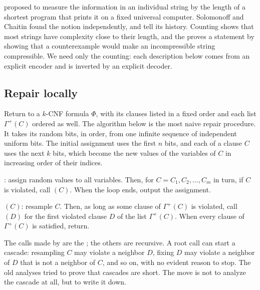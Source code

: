 \begin{refsection}
\textcite{Kolmogorov1965} proposed to measure the information in an individual string by the length of a shortest program that prints it on a fixed universal computer. Solomonoff and Chaitin found the notion independently, and \textcite{LiVitanyi2008} tell its history. Counting shows that most strings have complexity close to their length, and the  proves a statement by showing that a counterexample would make an incompressible string compressible. We need only the counting: each description below comes from an explicit encoder and is inverted by an explicit decoder.

\subsection{Repair locally}\label{sec:compression:algorithm}

Return to a $k$-CNF formula $\Phi$, with its clauses listed in a fixed order and each list $\Gamma^+(C)$ ordered as well. The algorithm below is the most naive repair procedure. It takes its random bits, in order, from one infinite sequence of independent uniform bits. The initial assignment uses the first $n$ bits, and each  of a clause $C$ uses the next $k$ bits, which become the new values of the variables of $C$ in increasing order of their indices.

\begin{definition}\label{def:compression:moser}
\compressionSolve: assign random values to all variables. Then, for $C=C_1,C_2,\dots,C_m$ in turn, if $C$ is violated, call \compressionFix$(C)$. When the loop ends, output the assignment.

\compressionFix$(C)$: resample $C$. Then, as long as some clause of $\Gamma^+(C)$ is violated, call \compressionFix$(D)$ for the first violated clause $D$ of the list $\Gamma^+(C)$. When every clause of $\Gamma^+(C)$ is satisfied, return.
\end{definition}

The calls made by \compressionSolve{} are the ; the others are recursive. A root call can start a cascade: resampling $C$ may violate a neighbor $D$, fixing $D$ may violate a neighbor of $D$ that is not a neighbor of $C$, and so on, with no evident reason to stop. The old analyses tried to prove that cascades are short. The move is not to analyze the cascade at all, but to write it down.


\end{refsection}
